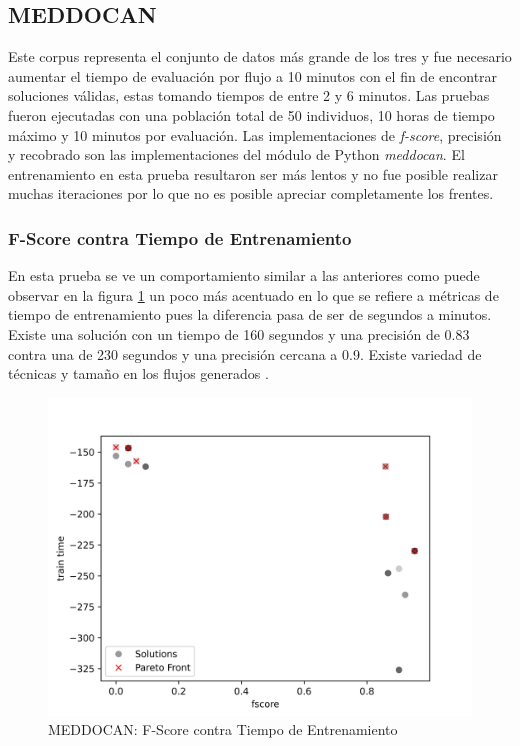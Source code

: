\subsection{MEDDOCAN}
Este corpus representa el conjunto de datos m\'as grande de los tres y  fue necesario aumentar el tiempo de evaluaci\'on por flujo a 10 minutos con el fin de encontrar soluciones v\'alidas, estas tomando tiempos de entre 2 y 6 minutos. Las pruebas fueron ejecutadas con una poblaci\'on total de 50 individuos, 10 horas de tiempo m\'aximo y 10 minutos por evaluaci\'on. 
Las implementaciones de \textit{f-score}, precisi\'on y recobrado son las implementaciones del m\'odulo de Python \textit{meddocan}.
El entrenamiento en esta prueba resultaron ser m\'as lentos y no fue posible realizar muchas iteraciones por lo que no es posible apreciar completamente los frentes.


\subsubsection{F-Score contra Tiempo de Entrenamiento}
En esta prueba se ve un comportamiento similar a las anteriores como puede observar en la figura  \ref{impl:fig:MEDDOCAN:fscore_vs_train_time} un poco m\'as acentuado en lo que se refiere a m\'etricas de tiempo de entrenamiento pues la diferencia pasa de ser de segundos a minutos. Existe una soluci\'on con un tiempo de 160 segundos y una precisi\'on de 0.83 contra una de 230 segundos y una precisi\'on cercana a 0.9. Existe variedad de t\'ecnicas y tama\~no en los flujos generados .


\begin{figure}[ht]
    \centering
    \includegraphics[scale=0.65]{Pictures/meddocan_fscore_vs_train.jpg}
    \caption{MEDDOCAN: F-Score contra Tiempo de Entrenamiento}
    \label{impl:fig:MEDDOCAN:fscore_vs_train_time}
\end{figure}


